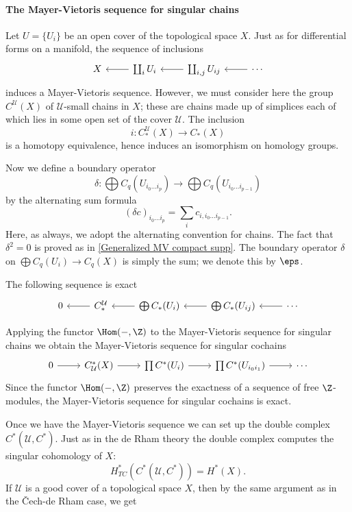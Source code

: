 \paragraph{The Mayer-Vietoris sequence for singular chains}
Let $U=\{U_i\}$ be an open cover of the topological space $X$. Just as for differential forms on a manifold, the sequence of inclusions
\[\begin{tikzcd}
X&\coprod_iU_i\ar[l]&\coprod_{i,j}U_{ij}\ar[l]&\cdots\ar[l]
\end{tikzcd}\]
induces a Mayer-Vietoris sequence. However, we must consider here the group $C^{\mathcal{U}}(X)$ of $\mathcal{U}$-small chains in $X$; these are chains made up of 
simplices each of which lies in some open set of the cover $\mathcal{U}$. The inclusion
\[i:C^{\mathcal{U}}_*(X)\to C_*(X)\]
is a homotopy equivalence, hence induces an isomorphism on homology groups.\par
Now we define a boundary operator
\[\delta:\bigoplus C_q(U_{i_0\dots i_p})\to \bigoplus C_q(U_{i_0\dots i_{p-1}})\]
by the alternating sum formula
\[(\delta c)_{i_0\dots i_p}=\sum_ic_{i,i_0\dots i_{p-1}}.\]
Here, as always, we adopt the alternating convention for chains. The fact that $\delta^2=0$ is proved as in \cref{Generalized MV compact supp}. The boundary 
operator $\delta$ on $\bigoplus C_q(U_i)\to C_q(X)$ is simply the sum; we denote this by $\eps$.
\begin{proposition}
The following sequence is exact
\[\begin{tikzcd}
0&C_*^{\mathcal{U}}\ar[l]&\bigoplus C_*(U_i)\ar[l]&\bigoplus C_*(U_{ij})\ar[l]&\cdots\ar[l]
\end{tikzcd}\]
\end{proposition}
Applying the functor $\Hom(-,\Z)$ to the Mayer-Vietoris sequence for singular chains we obtain the Mayer-Vietoris sequence for singular cochains
\[\begin{tikzcd}
0\ar[r]&C^*_{\mathcal{U}}(X)\ar[r]&\prod C^*(U_i)\ar[r]&\prod C^*(U_{i_0 i_1})\ar[r]&\cdots
\end{tikzcd}\]
Since the functor $\Hom(-,\Z)$ preserves the exactness of a sequence of free $\Z$-modules, the Mayer-Vietoris sequence for singular cochains is exact.\par
Once we have the Mayer-Vietoris sequence we can set up the double complex $C^*(\mathcal{U},C^*)$. Just as in the de Rham theory the double complex computes the singular 
cohomology of $X$:
\[H^*_{TC}(C^*(\mathcal{U},C^*))=H^*(X).\]
If $\mathcal{U}$ is a good cover of a topological space $X$, then by the same argument as in the \v{C}ech-de Rham case, we get
